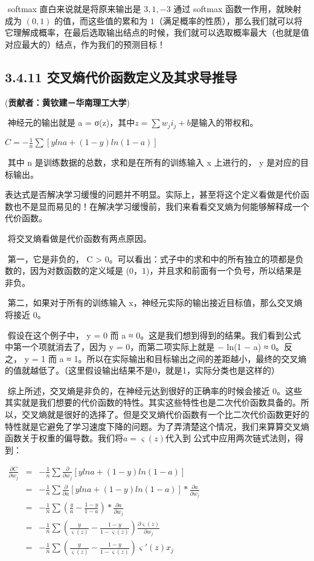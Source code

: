 ​ softmax 直白来说就是将原来输出是 $ 3,1,-3 $ 通过 softmax
函数一作用，就映射成为 $ (0,1) $ 的值，而这些值的累和为 $ 1
$（满足概率的性质），那么我们就可以将它理解成概率，在最后选取输出结点的时候，我们就可以选取概率最大（也就是值对应最大的）结点，作为我们的预测目标！

\subsection{3.4.11
交叉熵代价函数定义及其求导推导}\label{ux4ea4ux53c9ux71b5ux4ee3ux4ef7ux51fdux6570ux5b9aux4e49ux53caux5176ux6c42ux5bfcux63a8ux5bfc}

(\textbf{贡献者：黄钦建－华南理工大学})

​ 神经元的输出就是 a = σ(z)，其中\(z=\sum w_{j}i_{j}+b\)是输⼊的带权和。

\(C=-\frac{1}{n}\sum[ylna+(1-y)ln(1-a)]\)

​ 其中 n 是训练数据的总数，求和是在所有的训练输⼊ x 上进⾏的， y
是对应的⽬标输出。

​
表达式是否解决学习缓慢的问题并不明显。实际上，甚⾄将这个定义看做是代价函数也不是显⽽易⻅的！在解决学习缓慢前，我们来看看交叉熵为何能够解释成⼀个代价函数。

​ 将交叉熵看做是代价函数有两点原因。

​ 第⼀，它是⾮负的， C \textgreater{}
0。可以看出：式子中的求和中的所有独⽴的项都是负数的，因为对数函数的定义域是
(0，1)，并且求和前⾯有⼀个负号，所以结果是非负。

​ 第⼆，如果对于所有的训练输⼊
x，神经元实际的输出接近⽬标值，那么交叉熵将接近 0。

​ 假设在这个例⼦中， y = 0 ⽽ a ≈
0。这是我们想到得到的结果。我们看到公式中第⼀个项就消去了，因为 y =
0，⽽第⼆项实际上就是 − ln(1 − a) ≈ 0。反之， y = 1 ⽽ a ≈
1。所以在实际输出和⽬标输出之间的差距越⼩，最终的交叉熵的值就越低了。（这里假设输出结果不是0，就是1，实际分类也是这样的）

​ 综上所述，交叉熵是⾮负的，在神经元达到很好的正确率的时候会接近
0。这些其实就是我们想要的代价函数的特性。其实这些特性也是⼆次代价函数具备的。所以，交叉熵就是很好的选择了。但是交叉熵代价函数有⼀个⽐⼆次代价函数更好的特性就是它避免了学习速度下降的问题。为了弄清楚这个情况，我们来算算交叉熵函数关于权重的偏导数。我们将\(a={\varsigma}(z)\)代⼊到
公式中应⽤两次链式法则，得到：

\(\begin{eqnarray}\frac{\partial C}{\partial w_{j}}&=&-\frac{1}{n}\sum \frac{\partial }{\partial w_{j}}[ylna+(1-y)ln(1-a)]\\&=&-\frac{1}{n}\sum \frac{\partial }{\partial a}[ylna+(1-y)ln(1-a)]*\frac{\partial a}{\partial w_{j}}\\&=&-\frac{1}{n}\sum (\frac{y}{a}-\frac{1-y}{1-a})*\frac{\partial a}{\partial w_{j}}\\&=&-\frac{1}{n}\sum (\frac{y}{\varsigma(z)}-\frac{1-y}{1-\varsigma(z)})\frac{\partial \varsigma(z)}{\partial w_{j}}\\&=&-\frac{1}{n}\sum (\frac{y}{\varsigma(z)}-\frac{1-y}{1-\varsigma(z)}){\varsigma}'(z)x_{j}\end{eqnarray}\)

